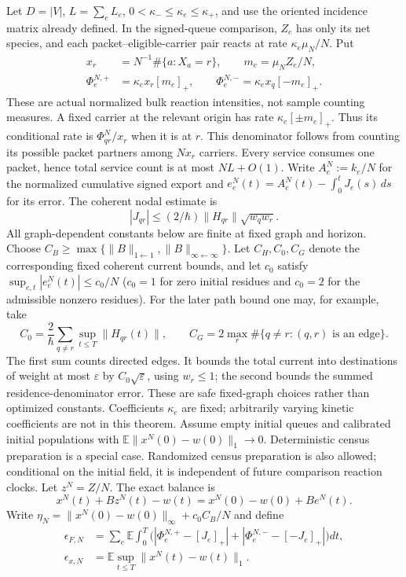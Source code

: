 \documentclass[11pt]{article}
\theoremstyle{definition}\newtheorem{definition}[theorem]{Definition}
\theoremstyle{remark}\newtheorem{remark}[theorem]{Remark}
\begin{document}
Let $D=|V|$, $L=\sum_e L_e$, $0<\kappa_-\le\kappa_e\le\kappa_+$, and use the oriented incidence matrix already defined. In the signed-queue comparison, $Z_e$ has only its net species, and each packet--eligible-carrier pair reacts at rate $\kappa_e\mu_N/N$. Put
\begin{align}
 x_r&=N^{-1}\#\{a:X_a=r\},\qquad m_e=\mu_N Z_e/N,\\
 \Phi_e^{N,+}&=\kappa_e x_r[m_e]_+,\qquad
 \Phi_e^{N,-}=\kappa_e x_q[-m_e]_+ .\label{kin:flux}
\end{align}
These are actual normalized bulk reaction intensities, not sample counting measures. A fixed carrier at the relevant origin has rate $\kappa_e[\pm m_e]_+$. Thus its conditional rate is $\Phi_{qr}^N/x_r$ when it is at $r$. This denominator follows from counting its possible packet partners among $Nx_r$ carriers. Every service consumes one packet, hence total service count is at most $NL+O(1)$.
Write $A_e^N:=k_e/N$ for the normalized cumulative signed export and $e_e^N(t)=A_e^N(t)-\int_0^t J_e(s)\,ds$ for its error. The coherent nodal estimate is
\begin{equation}
 |J_{qr}|\le (2/\hbar)\|H_{qr}\|\sqrt{w_qw_r} .\label{kin:nodal}
\end{equation}
All graph-dependent constants below are finite at fixed graph and horizon. Choose $C_B\ge\max\{\|B\|_{1\leftarrow1},\|B\|_{\infty\leftarrow\infty}\}$. Let $C_H,C_0,C_G$ denote the corresponding fixed coherent current bounds, and let $c_0$ satisfy $\sup_{e,t}|e_e^N(t)|\le c_0/N$ ($c_0=1$ for zero initial residues and $c_0=2$ for the admissible nonzero residues). For the later path bound one may, for example, take
\[
 C_0=\frac{2}{\hbar}\sum_{q\ne r}\sup_{t\le T}\|H_{qr}(t)\|,
 \qquad C_G=2\max_r\#\{q\ne r:(q,r)\text{ is an edge}\}.
\]
The first sum counts directed edges. It bounds the total current into destinations of weight at most $\varepsilon$ by $C_0\sqrt\varepsilon$, using $w_r\le1$; the second bounds the summed residence-denominator error. These are safe fixed-graph choices rather than optimized constants. Coefficients $\kappa_e$ are fixed; arbitrarily varying kinetic coefficients are not in this theorem.
Assume empty initial queues and calibrated initial populations with
$\mathbb E\|x^N(0)-w(0)\|_1\to0$. Deterministic census preparation is a
special case. Randomized census preparation is also allowed; conditional
on the initial field, it is independent of future comparison reaction
clocks. Let $z^N=Z/N$. The exact balance is
\begin{equation}
 x^N(t)+Bz^N(t)-w(t)=x^N(0)-w(0)+Be^N(t).
 \label{kin:balance}
\end{equation}
Write $\eta_N=\|x^N(0)-w(0)\|_\infty+c_0C_B/N$ and define
\begin{align}
 \epsilon_{F,N}&=\sum_e\mathbb E\int_0^T
 \bigl(|\Phi_e^{N,+}-[J_e]_+|+
 |\Phi_e^{N,-}-[-J_e]_+|\bigr)dt,\label{kin:epsF}\\
 \epsilon_{x,N}&=\mathbb E\sup_{t\le T}\|x^N(t)-w(t)\|_1.
 \label{kin:epsx}
\end{align}
\end{document}

